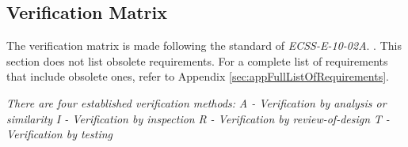 \documentclass[a4paper,12pt,twoside]{article}
\begin{document}
\subsection{Verification Matrix}

The verification matrix is made following the standard of \textit{ECSS-E-10-02A}. \cite{ECSSSecretariat}. This section does not list obsolete requirements. For a complete list of requirements that include obsolete ones, refer to Appendix \ref{sec:appFullListOfRequirements}.

\textit{There are four established verification methods:}
\newline \textit{A - Verification by analysis or similarity}
\newline \textit{I - Verification by inspection}
\newline \textit{R - Verification by review-of-design}
\newline \textit{T - Verification by testing}

\makeatletter
\renewcommand\@makefntext[1]{\leftskip=3em\hskip-1em\@makefnmark#1}
\makeatother
\end{document}

